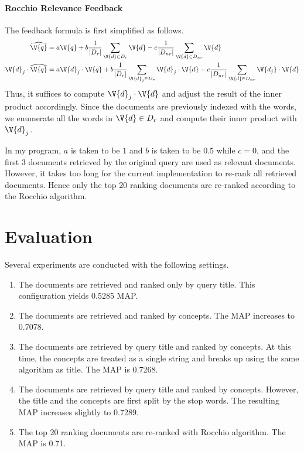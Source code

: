 \documentclass{article}
\begin{document}
\paragraph{Rocchio Relevance Feedback} The feedback formula is first simplified as follows.
\[\begin{aligned}
\widehat{\V{q}} &= a\V{q} + b\frac{1}{|D_r|}\sum_{\V{d}\in D_r}\V{d}-c\frac{1}{|D_{nr}|}\sum_{\V{d}\in D_{nr}} \V{d}\\
\V{d}_j\cdot\widehat{\V{q}} &= a \V{d}_j\cdot \V{q} + b\frac{1}{|D_r|} \sum_{\V{d}_j\in D_r} \V{d}_j\cdot\V{d}-c\frac{1}{|D_{nr}|}\sum_{\V{d}\in D_{nr}} \V{d_j}\cdot\V{d}
\end{aligned}\]
Thus, it suffices to compute $\V{d}_j\cdot\V{d}$ and adjust the result of the inner product accordingly.
Since the documents are previously indexed with the words, we enumerate all the words in $\V{d}\in D_r$
and compute their inner product with $\V{d}_j$.

In my program, $a$ is taken to be $1$ and $b$ is taken to be $0.5$ while $c=0$, and the first $3$
documents retrieved by the original query are used as relevant documents. However, it takes too
long for the current implementation to re-rank all retrieved documents. Hence only
the top 20 ranking documents are re-ranked according to the Rocchio algorithm.
\section{Evaluation}
Several experiments are conducted with the following settings.
\begin{enumerate}
  \item The documents are retrieved and ranked only by query title. This configuration yields 0.5285 MAP.
  \item The documents are retrieved and ranked by concepts. The MAP increases to 0.7078.
  \item The documents are retrieved by query title and ranked by concepts. At this time, the concepts
        are treated as a single string and breaks up using the same algorithm as title.
        The MAP is 0.7268.
  \item The documents are retrieved by query title and ranked by concepts. However, the title and the
        concepts are first split by the stop words. The resulting MAP increases slightly to 0.7289.
  \item The top 20 ranking documents are re-ranked with Rocchio algorithm. The MAP is 0.71.
\end{enumerate}
\end{document}
